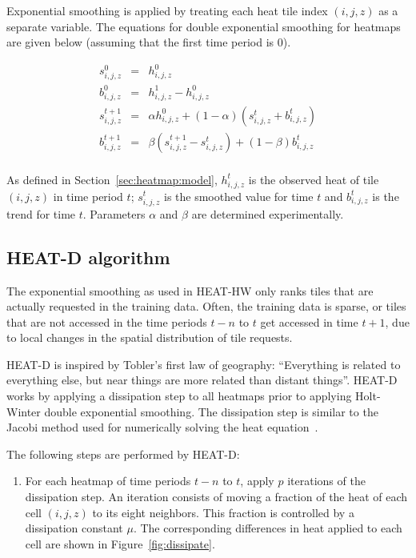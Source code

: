 \documentclass[11pt, oneside]{report}
\begin{document}
{Exponential smoothing is applied by treating each heat tile index $(i,j,z)$ as a separate variable. The equations for double exponential smoothing for heatmaps are given below (assuming that the first time period is $0$).

\begin{eqnarray*}
s_{i,j,z}^0 & = & h_{i,j,z}^0 \\
b_{i,j,z}^0 & = & h_{i,j,z}^1 - h_{i,j,z}^0 \\
s_{i,j,z}^{t+1} & = & \alpha h_{i,j,z}^0 + (1 - \alpha)(s_{i,j,z}^{t} + b_{i,j,z}^{t} ) \\
b_{i,j,z}^{t+1} & = & \beta (s_{i,j,z}^{t+1} - s_{i,j,z}^{t}) + (1 - \beta) b_{i,j,z}^{t}  \\
\end{eqnarray*}

As defined in Section~\ref{sec:heatmap:model}, $h_{i,j,z}^t$ is the observed heat of tile $(i,j,z)$ in time period $t$; $s_{i,j,z}^t$ is the smoothed value for time $t$ and $b_{i,j,z}^t$ is the trend for time $t$. Parameters $\alpha$ and $\beta$ are determined experimentally.

\subsection{HEAT-D algorithm}
\label{sec:heat:d}
The exponential smoothing as used in HEAT-HW only ranks tiles that are actually requested in the training data. Often, the training data is sparse, or tiles that are not accessed in the time periods $t-n$ to $t$ get accessed in time $t+1$, due to local changes in the spatial distribution of tile requests. 

HEAT-D is inspired by Tobler's first law of geography: ``Everything is related to everything else, but near things are more related than distant things''. HEAT-D works by applying a dissipation step to all heatmaps prior to applying Holt-Winter double exponential smoothing. The dissipation step is similar to the Jacobi method used for numerically solving the heat equation~\cite{templates}.

The following steps are performed by HEAT-D: 

\begin{enumerate}

\item For each heatmap of time periods $t-n$ to $t$, apply $p$ iterations of the dissipation step. An iteration consists of moving a fraction of the heat of each cell $(i,j,z)$ to its eight neighbors. This fraction is controlled by  a dissipation constant $\mu$. The corresponding differences in heat applied to each cell are shown in Figure~\ref{fig:dissipate}. 


\end{enumerate}}
\end{document}
